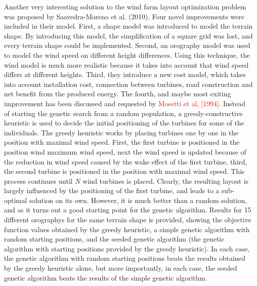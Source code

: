 \noindent Another very interesting solution to the wind farm layout optimization problem was proposed by Saavedra-Moreno et al. (2010). Four novel improvements were included in their model. First, a shape model was introduced to model the terrain shape. By introducing this model, the simplification of a square grid was lost, and every terrain shape could be implemented. Second, an orography model was used to model the wind speed on different height differences. Using this technique, the wind model is much more realistic because it takes into account that wind speed differs at different heights. Third, they introduce a new cost model, which takes into account installation cost, connection between turbines, road construction and net benefit from the produced energy. The fourth, and maybe most exiting improvement has been discussed and requested by \textcolor{red}{Mosetti et al, [1994]}. Instead of starting the genetic search from a random population, a greedy-constructive heuristic is used to decide the initial positioning of the turbines for some of the individuals. The greedy heuristic works by placing turbines one by one in the position with maximal wind speed. First, the first turbine is positioned in the position wind maximum wind speed, next the wind speed is updated because of the reduction in wind speed caused by the wake effect of the first turbine, third, the second turbine is positioned in the position with maximal wind speed. This process continues until $N$ wind turbines is placed. Clearly, the resulting layout is largely influenced by the positioning of the first turbine, and leads to a sub-optimal solution on its own. However, it is much better than a random solution, and as it turns out a good starting point for the genetic algorithm. Results for 15 different orographys for the same terrain shape is provided, showing the objective function values obtained by the greedy heuristic, a simple genetic algorithm with random starting positions, and the seeded genetic algorithm (the genetic algorithm with starting positions provided by the greedy heuristic). In each case, the genetic algorithm with random starting positions beats the results obtained by the greedy heuristic alone, but more importantly, in each case, the seeded genetic algorithm beats the results of the simple genetic algorithm. \\



